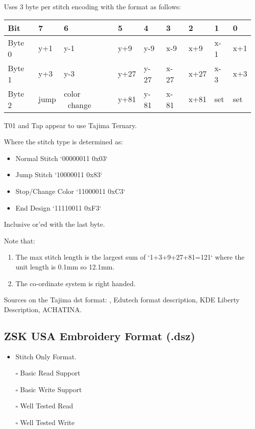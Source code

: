 \documentclass[onesize, a4paper]{refart}
\providecommand{\tightlist}{\setlength{\itemsep}{0pt}\setlength{\parskip}{0pt}}
\begin{document}
Uses 3 byte per stitch encoding with the format as follows:

\begin{tabularx}{\linewidth}{X@{}X@{}X@{}X@{}X@{}X@{}X@{}X@{}X@{}}
\caption{The 3 byte encoding for the dxf format.}\\
\toprule
\textbf{Bit} & \textbf{7} & \textbf{6} & \textbf{5} & \textbf{4} & \textbf{3} & \textbf{2} & \textbf{1} & \textbf{0} \\
\midrule
\endhead
Byte 0 & y+1 & y-1 & y+9 & y-9 & x-9 & x+9 & x-1 & x+1 \\
Byte 1 & y+3 & y-3 & y+27 & y-27 & x-27 & x+27 & x-3 & x+3 \\
Byte 2 & jump & color \break\ change & y+81 & y-81 & x-81 & x+81 & set & set \\
\end{tabularx}

T01 and Tap appear to use Tajima Ternary.
 
Where the stitch type is determined as:

\begin{itemize}
\item Normal Stitch `00000011 0x03`
\item Jump Stitch `10000011 0x83`
\item Stop/Change Color `11000011 0xC3`
\item End Design `11110011 0xF3`
\end{itemize}

Inclusive or'ed with the last byte.

Note that:

\begin{enumerate}
\item The max stitch length is the largest sum of `1+3+9+27+81=121` where the unit length is 0.1mm so 12.1mm.
\item The co-ordinate system is right handed.
\end{enumerate}

Sources on the Tajima dst format: \cite{fineEmbStudio2021},
Edutech format description\cite{eduTechWikiDST},
KDE Liberty Description\cite{libertyTajima}, ACHATINA\cite{achatina}.

\subsection{ZSK USA Embroidery Format (.dsz)}

\begin{itemize}
\tightlist
\item Stitch Only Format.
\item[$\square$] Basic Read Support
\item[$\square$] Basic Write Support
\item[$\square$] Well Tested Read
\item[$\square$] Well Tested Write
\end{itemize}
\end{document}
